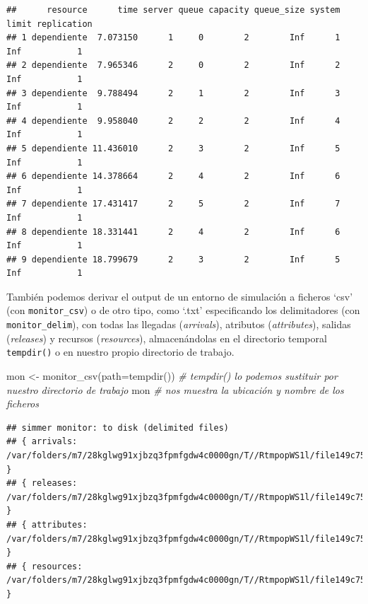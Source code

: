 \documentclass[
]{book}
\newenvironment{Shaded}{\begin{snugshade}}{\end{snugshade}}
\newcommand{\AttributeTok}[1]{\textcolor[rgb]{0.77,0.63,0.00}{#1}}
\newcommand{\CommentTok}[1]{\textcolor[rgb]{0.56,0.35,0.01}{\textit{#1}}}
\newcommand{\FunctionTok}[1]{\textcolor[rgb]{0.00,0.00,0.00}{#1}}
\newcommand{\NormalTok}[1]{#1}
\newcommand{\OtherTok}[1]{\textcolor[rgb]{0.56,0.35,0.01}{#1}}
\theoremstyle{definition}
\theoremstyle{definition}
\theoremstyle{definition}
\theoremstyle{definition}
\theoremstyle{remark}
\begin{document}
\begin{verbatim}
##      resource      time server queue capacity queue_size system limit replication
## 1 dependiente  7.073150      1     0        2        Inf      1   Inf           1
## 2 dependiente  7.965346      2     0        2        Inf      2   Inf           1
## 3 dependiente  9.788494      2     1        2        Inf      3   Inf           1
## 4 dependiente  9.958040      2     2        2        Inf      4   Inf           1
## 5 dependiente 11.436010      2     3        2        Inf      5   Inf           1
## 6 dependiente 14.378664      2     4        2        Inf      6   Inf           1
## 7 dependiente 17.431417      2     5        2        Inf      7   Inf           1
## 8 dependiente 18.331441      2     4        2        Inf      6   Inf           1
## 9 dependiente 18.799679      2     3        2        Inf      5   Inf           1
\end{verbatim}

También podemos derivar el output de un entorno de simulación a ficheros `csv' (con \texttt{monitor\_csv}) o de otro tipo, como `.txt' especificando los delimitadores (con \texttt{monitor\_delim}), con todas las llegadas (\emph{arrivals}), atributos (\emph{attributes}), salidas (\emph{releases}) y recursos (\emph{resources}), almacenándolas en el directorio temporal \texttt{tempdir()} o en nuestro propio directorio de trabajo.

\begin{Shaded}
\begin{Highlighting}[]
\NormalTok{mon }\OtherTok{\textless{}{-}} \FunctionTok{monitor\_csv}\NormalTok{(}\AttributeTok{path=}\FunctionTok{tempdir}\NormalTok{()) }\CommentTok{\# tempdir() lo podemos sustituir por nuestro directorio de trabajo}
\NormalTok{mon   }\CommentTok{\# nos muestra la ubicación y nombre de los ficheros}
\end{Highlighting}
\end{Shaded}

\begin{verbatim}
## simmer monitor: to disk (delimited files)
## { arrivals: /var/folders/m7/28kglwg91xjbzq3fpmfgdw4c0000gn/T//RtmpopWS1l/file149c75dc6a077_arrivals.csv }
## { releases: /var/folders/m7/28kglwg91xjbzq3fpmfgdw4c0000gn/T//RtmpopWS1l/file149c75dc6a077_releases.csv }
## { attributes: /var/folders/m7/28kglwg91xjbzq3fpmfgdw4c0000gn/T//RtmpopWS1l/file149c75dc6a077_attributes.csv }
## { resources: /var/folders/m7/28kglwg91xjbzq3fpmfgdw4c0000gn/T//RtmpopWS1l/file149c75dc6a077_resources.csv }
\end{verbatim}
\end{document}
